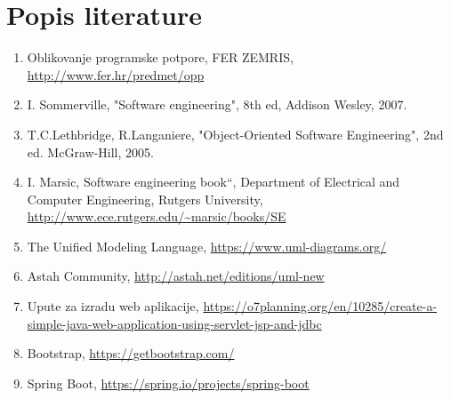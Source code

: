 \chapter*{Popis literature}
	 
		
		\begin{enumerate}
			
			
			\item  Oblikovanje programske potpore, FER ZEMRIS, \url{http://www.fer.hr/predmet/opp}
			
			\item  I. Sommerville, "Software engineering", 8th ed, Addison Wesley, 2007.
			
			\item  T.C.Lethbridge, R.Langaniere, "Object-Oriented Software Engineering", 2nd ed. McGraw-Hill, 2005.
			
			\item  I. Marsic, Software engineering book``, Department of Electrical and Computer Engineering, Rutgers University, \url{http://www.ece.rutgers.edu/~marsic/books/SE}
			
			\item  The Unified Modeling Language, \url{https://www.uml-diagrams.org/}
			
			\item  Astah Community, \url{http://astah.net/editions/uml-new}
			
			\item  Upute za izradu web aplikacije, \url{https://o7planning.org/en/10285/create-a-simple-java-web-application-using-servlet-jsp-and-jdbc}
			
			\item  Bootstrap, \url{https://getbootstrap.com/}
			
			\item  Spring Boot, \url{https://spring.io/projects/spring-boot}
		\end{enumerate}
		
		 